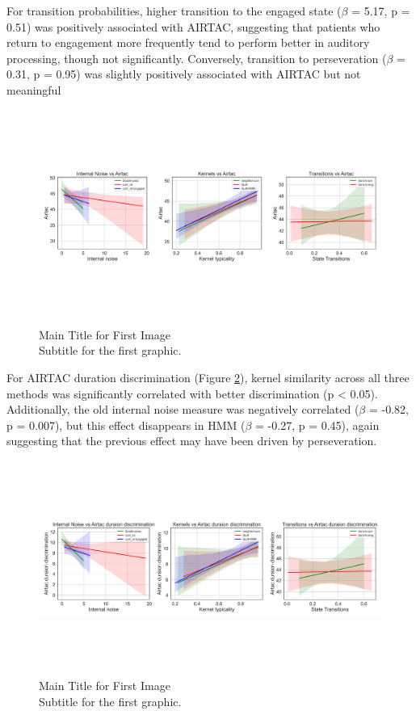 For transition probabilities, higher transition to the engaged state ($\beta$ = 5.17, p = 0.51) was positively associated with AIRTAC, suggesting that patients who return to engagement more frequently tend to perform better in auditory processing, though not significantly. Conversely, transition to perseveration ($\beta$ = 0.31, p = 0.95) was slightly positively associated with AIRTAC but not meaningful
\begin{figure}[H]
    \centering
    \includegraphics[width=17cm,height=7cm]{MainLayout/Images/chapter8/regression_results_airtac.jpg}
    \caption{Main Title for First Image \\ \small Subtitle for the first graphic.}
    \label{fig:regression_results_airtac}
\end{figure}
For AIRTAC duration discrimination (Figure \ref{fig:regression_results_airtac_dur_discr}), kernel similarity across all three methods was significantly correlated with better discrimination (p < 0.05). Additionally, the old internal noise measure was negatively correlated ($\beta$ = -0.82, p = 0.007), but this effect disappears in HMM ($\beta$ = -0.27, p = 0.45), again suggesting that the previous effect may have been driven by perseveration.
\begin{figure}[H]
    \centering
    \includegraphics[width=17cm,height=7cm]{MainLayout/Images/chapter8/regression_results_airtac_dur_discr.jpg}
    \caption{Main Title for First Image \\ \small Subtitle for the first graphic.}
    \label{fig:regression_results_airtac_dur_discr}
\end{figure}
